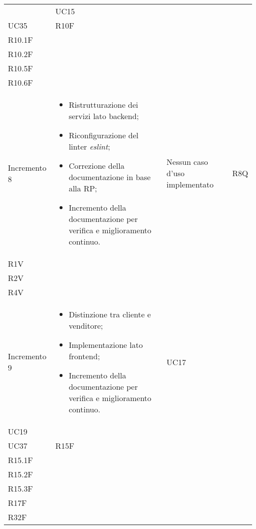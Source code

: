 \begin{longtable}{
    >{\centering}p{}
    >{\raggedright}p{}
    >{\centering}p{}
    >{\centering}p{}
    }
                                  & UC15                                                                                           \\ UC35                                                                 & R10F                                                                                                       \\ R10.1F \\ R10.2F \\ R10.5F\\ R10.6F
    \tabularnewline

    Incremento 8
                                  &
    \vspace{-15px}
    \begin{itemize}
        \renewcommand\labelitemi{-}
        \item Ristrutturazione dei servizi lato backend;
        \item Riconfigurazione del linter \textit{eslint};
        \item Correzione della documentazione in base alla RP;
        \item Incremento della documentazione per verifica e miglioramento continuo.
    \end{itemize}
                                  & Nessun caso d'uso implementato & R8Q                                                           \\ R1V \\ R2V \\ R4V    \tabularnewline

    Incremento 9                  &
    \vspace{-15px}
    \begin{itemize}
        \renewcommand\labelitemi{-}
        \item Distinzione tra cliente e venditore;
        \item Implementazione lato frontend;
        \item Incremento della documentazione per verifica e miglioramento continuo.
    \end{itemize}
                                  & UC17                                                                                           \\ UC19  \\ UC37
                                  & R15F                                                                                           \\ R15.1F \\ R15.2F \\ R15.3F \\ R17F \\ R32F
    \tabularnewline


\end{longtable}
